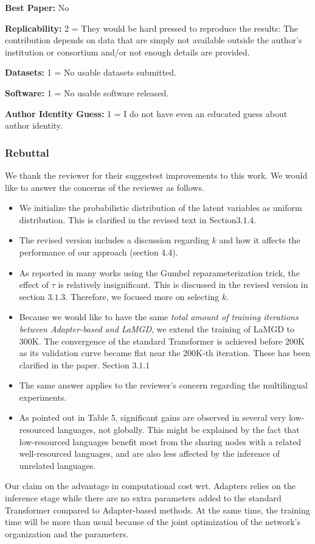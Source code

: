 \documentclass[12pt,times,a4paper,twoside]{article}
\theoremstyle{definition}
\begin{document}
\textbf{Best Paper:} No

\textbf{Replicability:} 2 = They would be hard pressed to reproduce the results: The contribution depends on data that are simply not available outside the author's institution or consortium and/or not enough details are provided.

\textbf{Datasets:} 1 = No usable datasets submitted.

\textbf{Software:} 1 = No usable software released.

\textbf{Author Identity Guess:} 1 = I do not have even an educated guess about author identity.

\subsubsection*{Rebuttal}
{\color{blue}%
We thank the reviewer for their suggestest improvements to this work. We would like to answer the concerns of the reviewer as follows.

\begin{itemize}
\item We initialize the probabilistic distribution of the latent variables as uniform distribution. This is clarified in the revised text in Section$3.1.4$.
\item The revised version includes a discussion regarding $k$ and how it affects the performance of our approach (section 4.4).
\item As reported in many works using the Gumbel reparameterization trick, the effect of $\tau$ is relatively insignificant. This is discussed in the revised version in section $3.1.3$. Therefore, we focused more on selecting $k$. 
\item Because we would like to have the same \emph{total amount of training iterations between Adapter-based and LaMGD}, we extend the training of LaMGD to 300K. The convergence of the standard Transformer is achieved before 200K as its validation curve became flat near the 200K-th iteration. These has been clarified in the paper.  Section $3.1.1$
\item The same answer applies to the reviewer's concern regarding the multilingual experiments.
\item As pointed out in Table 5, significant gains are observed in several very low-resourced languages, not globally. This might be explained by the fact that low-resourced languages benefit most from the sharing nodes with a related well-resourced languages, and are also less affected by the inference of unrelated languages.
\end{itemize}

Our claim on the advantage in computational cost wrt. Adapters relies on the inference stage while there are no extra parameters added to the standard Transformer compared to Adapter-based methods. At the same time, the training time will be more than usual because of the joint optimization of the network's organization and the parameters. 
}%
\end{document}
